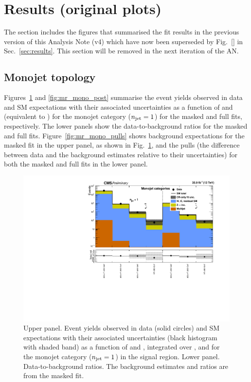 \section{Results (original plots)}
\label{app:results-orig}

The section includes the figures that summarised the fit results in
the previous version of this Analysis Note (v4) which have now been
superseded by Fig.~\ref{} in Sec.~\ref{sec:results}. This section will
be removed in the next iteration of the AN.  

\subsection{Monojet topology}
\label{app:results-orig-mono}

Figures~\ref{fig:mr_mono_pre} and \ref{fig:mr_mono_post} summarise the
event yields observed in data and SM expectations with their
associated uncertainties as a function of \nb and \scalht (equivalent
to \mht) for the monojet category ($n_{\text{jet}} = 1$) for the masked and
full fits, respectively. The lower panels show the data-to-background
ratios for the masked and full fits.  Figure~\ref{fig:mr_mono_pulls}
shows background expectations for the masked fit in the upper panel,
as shown in Fig.~\ref{fig:mr_mono_pre}, and the pulls (\ie the
difference between data and the background estimates relative to their
uncertainties) for both the masked and full fits in the lower panel.

\clearpage
\begin{figure}[h!]
  \centering
  \caption{Upper panel. Event yields observed in data (solid circles)
    and SM expectations with their associated uncertainties (black
    histogram with shaded band) as a function of \nb and \scalht,
    integrated over \mht, and for the monojet category ($n_{\text{jet}} = 1$)
    in the signal region. Lower panel. Data-to-background ratios. The
    background estimates and ratios are from the masked fit. }
  \label{fig:mr_mono_pre}
  \includegraphics[width=1.\linewidth]{figures/results/36invfb_preapproval/mono/summaryPlot_Monojet_prefit}
\end{figure}

